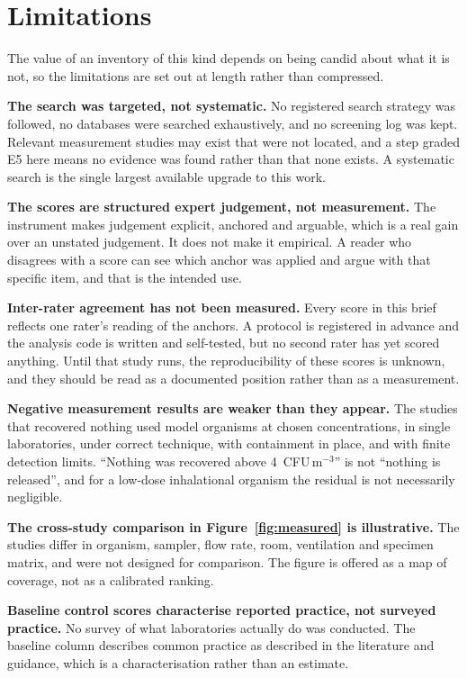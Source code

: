 \section{Limitations}
\label{sec:limits}

The value of an inventory of this kind depends on being candid about what it
is not, so the limitations are set out at length rather than compressed.

\textbf{The search was targeted, not systematic.} No registered search
strategy was followed, no databases were searched exhaustively, and no
screening log was kept. Relevant measurement studies may exist that were not
located, and a step graded E5 here means no evidence was found rather than
that none exists. A systematic search is the single largest available upgrade
to this work.

\textbf{The scores are structured expert judgement, not measurement.} The
instrument makes judgement explicit, anchored and arguable, which is a real
gain over an unstated judgement. It does not make it empirical. A reader who
disagrees with a score can see which anchor was applied and argue with that
specific item, and that is the intended use.

\textbf{Inter-rater agreement has not been measured.} Every score in this
brief reflects one rater's reading of the anchors. A protocol is registered in
advance and the analysis code is written and self-tested, but no second rater
has yet scored anything. Until that study runs, the reproducibility of these
scores is unknown, and they should be read as a documented position rather
than as a measurement.

\textbf{Negative measurement results are weaker than they appear.} The studies
that recovered nothing used model organisms at chosen concentrations, in single
laboratories, under correct technique, with containment in place, and with
finite detection limits. ``Nothing was recovered above 4~CFU\,m$^{-3}$'' is not
``nothing is released'', and for a low-dose inhalational organism the residual
is not necessarily negligible.

\textbf{The cross-study comparison in Figure~\ref{fig:measured} is
illustrative.} The studies differ in organism, sampler, flow rate, room,
ventilation and specimen matrix, and were not designed for comparison. The
figure is offered as a map of coverage, not as a calibrated ranking.

\textbf{Baseline control scores characterise reported practice, not surveyed
practice.} No survey of what laboratories actually do was conducted. The
baseline column describes common practice as described in the literature and
guidance, which is a characterisation rather than an estimate.

